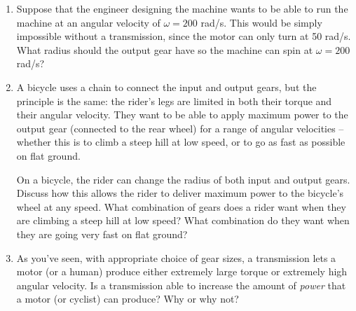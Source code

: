 \documentclass[12pt]{article}
\begin{document}
\begin{enumerate}
\vspace{1.5in}


\item Suppose that the engineer designing the machine wants to be able to run the machine at an angular velocity of $\omega = 200$ rad/s. This would be simply impossible without a transmission, since the motor can only turn at 50 rad/s. What radius should the output gear have so the machine can spin at $\omega = 200$ rad/s?


\vspace{3in}

\newpage


\item A bicycle uses a chain to connect the input and output gears, but the principle is the same: the rider's legs are limited in both their torque and their angular velocity. They want to be able to apply maximum power to the output gear (connected to the rear wheel) for a range of angular velocities -- whether this is to climb a steep hill at low speed, or to go as fast as possible on flat ground. 

On a bicycle, the rider can change the radius of both input and output gears. Discuss how this allows the rider to deliver maximum power to the bicycle's wheel at any speed. What combination of gears does a rider want when they are climbing a steep hill at low speed? What combination do they want when they are going very fast on flat ground?

\vspace{3in}


\item As you've seen, with appropriate choice of gear sizes, a transmission lets a motor (or a human) produce either extremely large torque or extremely high angular velocity. Is a transmission able to increase the amount of {\it power} that a motor (or cyclist) can produce? Why or why not?

\end{enumerate}

\newpage
\end{document}
